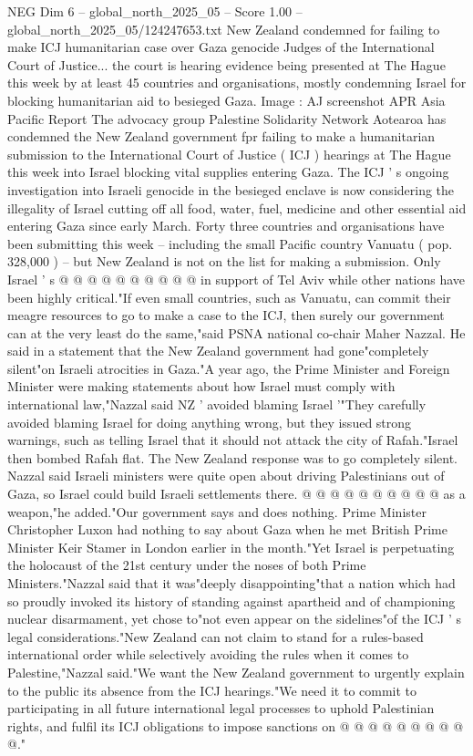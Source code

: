 \begin{textsample}{NEG Dim 6 – global\_north\_2025\_05 – Score 1.00 – global\_north\_2025\_05/124247653.txt}  \label{ex:f6_neg_385}
New Zealand condemned for failing to make ICJ humanitarian case over Gaza genocide Judges of the International Court of Justice... the court is hearing evidence being presented at The Hague this week by at least 45 countries and organisations, mostly condemning Israel for blocking humanitarian aid to besieged Gaza.
Image : AJ screenshot APR Asia Pacific Report The advocacy group Palestine Solidarity Network Aotearoa has condemned the New Zealand government fpr failing to make a humanitarian submission to the International Court of Justice ( ICJ ) hearings at The Hague this week into Israel blocking vital supplies entering Gaza.
The ICJ ' s ongoing investigation into Israeli genocide in the besieged enclave is now considering the illegality of Israel cutting off all food, water, fuel, medicine and other essential aid entering Gaza since early March.
Forty three countries and organisations have been submitting this week -- including the small Pacific country Vanuatu ( pop. 328,000 ) -- but New Zealand is not on the list for making a submission.
Only Israel ' s @ @ @ @ @ @ @ @ @ @ in support of Tel Aviv while other nations have been highly critical."If even small countries, such as Vanuatu, can commit their meagre resources to go to make a case to the ICJ, then surely our government can at the very least do the same,"said PSNA national co-chair Maher Nazzal.
He said in a statement that the New Zealand government had gone"completely silent"on Israeli atrocities in Gaza."A year ago, the Prime Minister and Foreign Minister were making statements about how Israel must comply with international law,"Nazzal said NZ ' avoided blaming Israel '"They carefully avoided blaming Israel for doing anything wrong, but they issued strong warnings, such as telling Israel that it should not attack the city of Rafah."Israel then bombed Rafah flat.
The New Zealand response was to go completely silent.
Nazzal said Israeli ministers were quite open about driving Palestinians out of Gaza, so Israel could build Israeli settlements there. @ @ @ @ @ @ @ @ @ @ as a weapon,"he added."Our government says and does nothing.
Prime Minister Christopher Luxon had nothing to say about Gaza when he met British Prime Minister Keir Stamer in London earlier in the month."Yet Israel is perpetuating the holocaust of the 21st century under the noses of both Prime Ministers."Nazzal said that it was"deeply disappointing"that a nation which had so proudly invoked its history of standing against apartheid and of championing nuclear disarmament, yet chose to"not even appear on the sidelines"of the ICJ ' s legal considerations."New Zealand can not claim to stand for a rules-based international order while selectively avoiding the rules when it comes to Palestine,"Nazzal said."We want the New Zealand government to urgently explain to the public its absence from the ICJ hearings."We need it to commit to participating in all future international legal processes to uphold Palestinian rights, and fulfil its ICJ obligations to impose sanctions on @ @ @ @ @ @ @ @ @ @."

\end{textsample}

